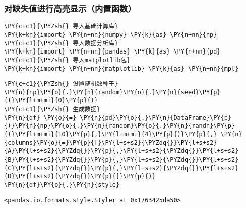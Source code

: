     \hypertarget{ux5bf9ux7f3aux5931ux503cux8fdbux884cux9ad8ux4eaeux663eux793aux5185ux7f6eux51fdux6570}{%
\subsubsection{对缺失值进行高亮显示（内置函数）}\label{ux5bf9ux7f3aux5931ux503cux8fdbux884cux9ad8ux4eaeux663eux793aux5185ux7f6eux51fdux6570}}

    \begin{tcolorbox}[breakable, size=fbox, boxrule=1pt, pad at break*=1mm,colback=cellbackground, colframe=cellborder]
\begin{Verbatim}[commandchars=\\\{\}]
\PY{c+c1}{\PYZsh{} 导入基础计算库}
\PY{k+kn}{import} \PY{n+nn}{numpy} \PY{k}{as} \PY{n+nn}{np}
\PY{c+c1}{\PYZsh{} 导入数据分析库}
\PY{k+kn}{import} \PY{n+nn}{pandas} \PY{k}{as} \PY{n+nn}{pd}
\PY{c+c1}{\PYZsh{} 导入matplotlib包}
\PY{k+kn}{import} \PY{n+nn}{matplotlib} \PY{k}{as} \PY{n+nn}{mpl}
\end{Verbatim}
\end{tcolorbox}

    \begin{tcolorbox}[breakable, size=fbox, boxrule=1pt, pad at break*=1mm,colback=cellbackground, colframe=cellborder]
\begin{Verbatim}[commandchars=\\\{\}]
\PY{c+c1}{\PYZsh{} 设置随机数种子}
\PY{n}{np}\PY{o}{.}\PY{n}{random}\PY{o}{.}\PY{n}{seed}\PY{p}{(}\PY{l+m+mi}{0}\PY{p}{)}
\PY{c+c1}{\PYZsh{} 生成数据}
\PY{n}{df} \PY{o}{=} \PY{n}{pd}\PY{o}{.}\PY{n}{DataFrame}\PY{p}{(}\PY{n}{np}\PY{o}{.}\PY{n}{random}\PY{o}{.}\PY{n}{randn}\PY{p}{(}\PY{l+m+mi}{10}\PY{p}{,}\PY{l+m+mi}{4}\PY{p}{)}\PY{p}{,} \PY{n}{columns}\PY{o}{=}\PY{p}{[}\PY{l+s+s2}{\PYZdq{}}\PY{l+s+s2}{A}\PY{l+s+s2}{\PYZdq{}}\PY{p}{,}\PY{l+s+s2}{\PYZdq{}}\PY{l+s+s2}{B}\PY{l+s+s2}{\PYZdq{}}\PY{p}{,}\PY{l+s+s2}{\PYZdq{}}\PY{l+s+s2}{C}\PY{l+s+s2}{\PYZdq{}}\PY{p}{,}\PY{l+s+s2}{\PYZdq{}}\PY{l+s+s2}{D}\PY{l+s+s2}{\PYZdq{}}\PY{p}{]}\PY{p}{)}
\PY{n}{df}\PY{o}{.}\PY{n}{style}
\end{Verbatim}
\end{tcolorbox}

            \begin{tcolorbox}[breakable, size=fbox, boxrule=.5pt, pad at break*=1mm, opacityfill=0]
\begin{Verbatim}[commandchars=\\\{\}]
<pandas.io.formats.style.Styler at 0x1763425da50>
\end{Verbatim}
\end{tcolorbox}
        
